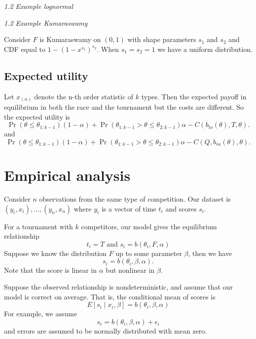 \documentclass[11pt]{article}
\begin{document}
\textit{1.2 Example lognormal}

\textit{1.2 Example Kumaraswamy}

Consider $F$ is Kumaraswamy on $(0,1)$ with shape parameters $s_1$ and $s_2$ and CDF equal to $1-(1-x^{s_1})^{s_2}$. When $s_1=s_2=1$ we have a uniform distribution.


\subsection{Expected utility}

Let $x_{(n)}$ denote the n-th order statistic of $k$ types. 
Then the expected payoff in equilibrium in both the race and the tournament but the costs are different. So the expected utility is
\begin{equation}
\Pr(\theta\leq\theta_{1:k-1}) (1-\alpha) + \Pr(\theta_{1:k-1}>\theta\leq\theta_{2:k-1}) \alpha - C(b_{to}(\theta), T, \theta).
\end{equation}
and 
\begin{equation}
\Pr(\theta\leq\theta_{1:k-1}) (1-\alpha) + \Pr(\theta_{1:k-1}>\theta\leq\theta_{2:k-1}) \alpha - C(Q, b_{ra}(\theta), \theta).
\end{equation}


\section{Empirical analysis}

Consider $n$ observations from the same type of competition. Our dataset is $(y_i, x_i), ..., (y_n, x_n)$ where $y_i$ is a vector of time $t_i$ and scores $s_i$. 

For a tournament with $k$ competitors, our model gives the equilibrium relationship
\begin{equation}
  t_i = T \text{ and } s_i = b(\theta_i, F, \alpha)
\end{equation}
Suppose we know the distribution $F$ up to some parameter $\beta$, then we have
\begin{equation}
  s_i = b(\theta_i, \beta, \alpha). 
\end{equation}
Note that the score is linear in $\alpha$ but nonlinear in $\beta$. 


Suppose the observed relationship is nondeterministic, and assume that our model is correct on average. That is, the conditional mean of scores is 
\begin{equation}
  E[s_i \mid x_i, \beta] = b(\theta_i, \beta, \alpha)
\end{equation}
For example, we assume
\begin{equation}
  s_i = b(\theta_i, \beta, \alpha) + \epsilon_i
\end{equation}
and errors are assumed to be normally distributed with mean zero. 
\end{document}
